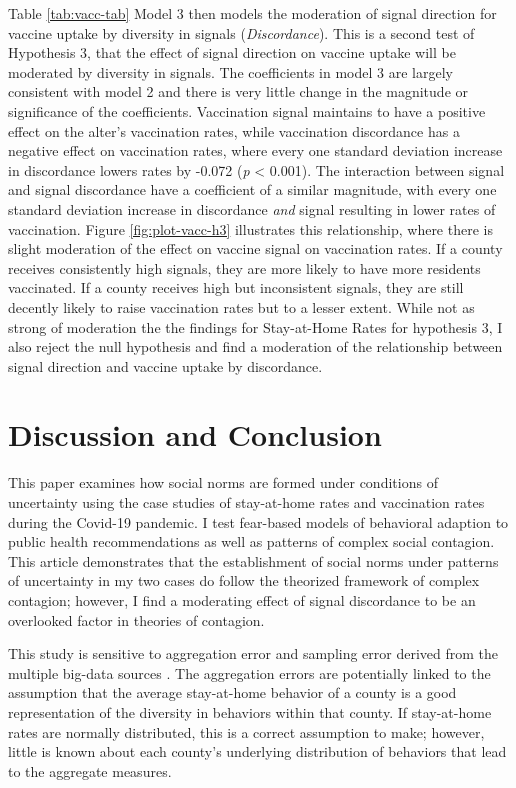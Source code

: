 Table \ref{tab:vacc-tab} Model 3 then models the moderation of signal direction
for vaccine uptake by diversity in signals (\emph{Discordance}). This is a second
test of Hypothesis 3, that the effect of signal direction on vaccine uptake will
be moderated by diversity in signals. The coefficients in model 3 are largely
consistent with model 2 and there is very little change in the magnitude
or significance of the coefficients. Vaccination signal maintains to have a positive
effect on the alter's vaccination rates, while vaccination discordance has a negative effect on vaccination rates, where every one standard deviation increase in discordance lowers rates by -0.072 (\emph{p} \textless{} 0.001). The interaction between signal and signal discordance have a coefficient of a similar magnitude, with every one standard deviation increase
in discordance \emph{and} signal resulting in 
lower rates of vaccination. Figure \ref{fig:plot-vacc-h3} illustrates this
relationship, where there is slight moderation of the effect on vaccine signal
on vaccination rates. If a county receives consistently high signals, they are
more likely to have more residents vaccinated. If a county receives high but
inconsistent signals, they are still decently likely to raise vaccination rates
but to a lesser extent. While not as strong of moderation the the findings for
Stay-at-Home Rates for hypothesis 3, I also reject the null hypothesis and find
a moderation of the relationship between signal direction and vaccine uptake by
discordance.

\hypertarget{discussion-and-conclusion}{%
\section{Discussion and Conclusion}\label{discussion-and-conclusion}}

This paper examines how social norms are formed under conditions of uncertainty
using the case studies of stay-at-home rates and vaccination rates during the
Covid-19 pandemic. I test fear-based models of behavioral adaption to public
health recommendations as well as patterns of complex social contagion. This
article demonstrates that the establishment of social norms under patterns of
uncertainty in my two cases do follow the theorized framework of complex
contagion; however, I find a moderating effect of signal discordance to be an
overlooked factor in theories of contagion.

This study is sensitive to aggregation error and sampling error derived from the
multiple big-data sources \citep{facebook20, google2020}. The aggregation errors are
potentially linked to the assumption that the average stay-at-home behavior of a
county is a good representation of the diversity in behaviors within that
county. If stay-at-home rates are normally distributed, this is a correct
assumption to make; however, little is known about each county's underlying
distribution of behaviors that lead to the aggregate measures.

